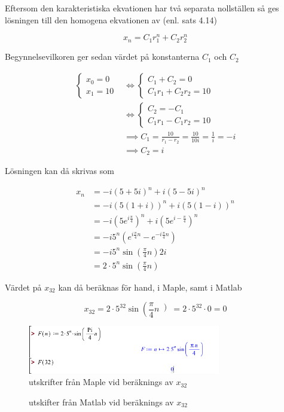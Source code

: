 \documentclass[a4paper]{article}
\begin{document}
Eftersom den karakteristiska ekvationen har två separata nollställen så ges lösningen till den homogena ekvationen av (enl. sats 4.14)

\begin{equation*}
	x_n = C_1r_1^n + C_2r_2^n
\end{equation*}
	
Begynnelsevilkoren ger sedan värdet på konstanterna $C_1$ och $C_2$

\begin{align*}
	\begin{cases}
		x_0 = 0\\
		x_1 = 10
	\end{cases}
	&\iff
	\begin{cases}
		C_1 + C_2 = 0\\
		C_1r_1 + C_2r_2 = 10
	\end{cases}\\
	&\iff
	\begin{cases}
		C_2 = -C_1\\
		C_1r_1 - C_1r_2 = 10
	\end{cases}\\
	&\implies C_1 = \frac{10}{r_1 - r_2} = \frac{10}{10i} = \frac{1}{i} = -i\\
	&\implies C_2 = i
\end{align*}

Lösningen kan då skrivas som

\begin{align*}
	x_n		&= -i(5+5i)^n + i(5-5i)^n\\
			&= -i(5(1+i))^n + i(5(1-i))^n\\
			&= -i(5e^{i\frac{\pi}{4}})^n + i(5e^{i-\frac{\pi}{4}})^n\\
			&= -i5^n(e^{i\frac{\pi}{4}n} - e^{-i\frac{\pi}{4}n})\\
			&= -i5^n\sin\left(\frac{\pi}{4}n\right)2i\\
			&= 2\cdot5^n\sin\left(\frac{\pi}{4}n\right)
\end{align*}

Värdet på $x_{32}$ kan då beräknas för hand, i Maple, samt i Matlab

\begin{equation*}
	x_{32} = 2\cdot5^{32}\sin\left(\frac{\pi}{4}n\left) = 2\cdot5^{32}\cdot 0 = 0
\end{equation*}

\begin{figure}[h!]
	\centering
	\includegraphics[width=0.75\textwidth]{maple.png}
	\caption{utskrifter från Maple vid beräknings av $x_{32}$}
	\label{fig:maple}
\end{figure}

\begin{figure}[h!]
	\centering
	\caption{utskifter från Matlab vid beräknings av $x_{32}$}
	\label{fig:maple}
\end{figure}
\end{document}
